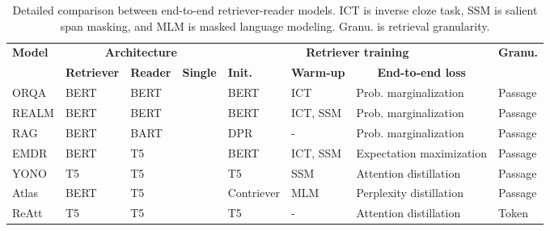 \documentclass[11pt, dvipsnames]{article}
\def\tinycol{\hskip 2pt}
\newcommand{\ours}{ReAtt\xspace}
\newcommand{\cmark}{\ding{51}}
\newcommand{\xmark}{\ding{55}}
\begin{document}
\appendix
\begin{table*}[tb]
\centering
\small
\begin{tabular}{l|l@{\tinycol}l@{\tinycol}l|l@{\tinycol}l@{\tinycol}l|l}
\toprule
\multirow{2}{*}{\textbf{Model}} & \multicolumn{3}{c|}{\textbf{Architecture}} & \multicolumn{3}{c|}{\textbf{Retriever training}} & \multirow{2}{*}{\textbf{Granu.}} \\
 & \textbf{Retriever} & \textbf{Reader} & \textbf{Single} & \textbf{Init.} & \textbf{Warm-up} & \multicolumn{1}{c|}{\textbf{End-to-end loss}} & \\
\midrule
ORQA \cite{orqa-2019-lee} & BERT & BERT & \xmark & BERT & ICT & Prob. marginalization & Passage \\
REALM \cite{realm-2020-guu} & BERT & BERT & \xmark & BERT & ICT, SSM & Prob. marginalization & Passage \\
RAG \cite{rag-2020-lewis} & BERT & BART & \xmark & DPR & - & Prob. marginalization & Passage \\
EMDR \cite{emdr2-2021-sachan} & BERT & T5 & \xmark & BERT & ICT, SSM & Expectation maximization & Passage \\
YONO \cite{yono-2021-lee} & T5 & T5 & \cmark & T5 & SSM & Attention distillation & Passage \\
Atlas \cite{atlas-2022-izacard} & BERT & T5 & \xmark & Contriever & MLM & Perplexity distillation & Passage \\
\midrule
\ours & T5 & T5 & \cmark & T5 & - & Attention distillation & Token \\
\bottomrule
\end{tabular}
\caption{Detailed comparison between end-to-end retriever-reader models. ICT is inverse cloze task, SSM is salient span masking, and MLM is masked language modeling. Granu. is retrieval granularity.}
\label{tab:retaug_related}
\end{table*}
\end{document}
